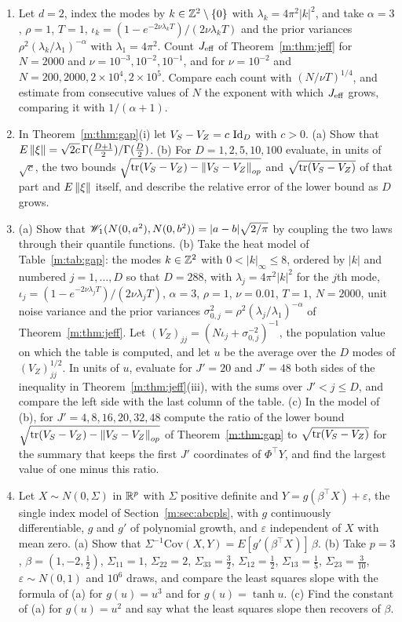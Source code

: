 \begin{enumerate}
\item Let $d=2$, index the modes by $k\in\mathbb{Z}^2\setminus\{0\}$ with $\lambda_k=4\pi^2|k|^2$, and take $\alpha=3$, $\rho=1$, $T=1$, $\iota_k=(1-e^{-2\nu\lambda_kT})/(2\nu\lambda_kT)$ and the prior variances $\rho^2(\lambda_k/\lambda_1)^{-\alpha}$ with $\lambda_1=4\pi^2$. Count $J_{\rm eff}$ of Theorem~\ref{m:thm:jeff} for $N=2000$ and $\nu=10^{-3},10^{-2},10^{-1}$, and for $\nu=10^{-2}$ and $N=200,2000,2\times10^4,2\times10^5$. Compare each count with $(N/\nu T)^{1/4}$, and estimate from consecutive values of $N$ the exponent with which $J_{\rm eff}$ grows, comparing it with $1/(\alpha+1)$.
\item In Theorem~\ref{m:thm:gap}(i) let $V_S-V_Z=c\,\operatorname{Id}_D$ with $c>0$. (a) Show that $E\left\|\xi\right\|=\sqrt{2c}\,\Gamma(\tfrac{D+1}2)/\Gamma(\tfrac D2)$. (b) For $D=1,2,5,10,100$ evaluate, in units of $\sqrt c$, the two bounds $\sqrt{\mathrm{tr}(V_S-V_Z)-\left\|V_S-V_Z\right\|_{op}}$ and $\sqrt{\mathrm{tr}(V_S-V_Z)}$ of that part and $E\left\|\xi\right\|$ itself, and describe the relative error of the lower bound as $D$ grows.
\item (a) Show that $\mathscr{W}_1(N(0,a^2),N(0,b^2))=|a-b|\sqrt{2/\pi}$ by coupling the two laws through their quantile functions. (b) Take the heat model of Table~\ref{m:tab:gap}: the modes $k\in\mathbb{Z}^2$ with $0<|k|_\infty\le8$, ordered by $|k|$ and numbered $j=1,\dots,D$ so that $D=288$, with $\lambda_j=4\pi^2|k|^2$ for the $j$th mode, $\iota_j=(1-e^{-2\nu\lambda_jT})/(2\nu\lambda_jT)$, $\alpha=3$, $\rho=1$, $\nu=0.01$, $T=1$, $N=2000$, unit noise variance and the prior variances $\sigma^2_{0,j}=\rho^2(\lambda_j/\lambda_1)^{-\alpha}$ of Theorem~\ref{m:thm:jeff}. Let $(V_Z)_{jj}=(N\iota_j+\sigma_{0,j}^{-2})^{-1}$, the population value on which the table is computed, and let $u$ be the average over the $D$ modes of $(V_Z)_{jj}^{1/2}$. In units of $u$, evaluate for $J'=20$ and $J'=48$ both sides of the inequality in Theorem~\ref{m:thm:jeff}(iii), with the sums over $J'<j\le D$, and compare the left side with the last column of the table. (c) In the model of (b), for $J'=4,8,16,20,32,48$ compute the ratio of the lower bound $\sqrt{\mathrm{tr}(V_S-V_Z)-\left\|V_S-V_Z\right\|_{op}}$ of Theorem~\ref{m:thm:gap} to $\sqrt{\mathrm{tr}(V_S-V_Z)}$ for the summary that keeps the first $J'$ coordinates of $\Phi^\top Y$, and find the largest value of one minus this ratio.
\item Let $X\sim N(0,\Sigma)$ in $\mathbb{R}^p$ with $\Sigma$ positive definite and $Y=g(\beta^\top X)+\varepsilon$, the single index model of Section~\ref{m:sec:abcpls}, with $g$ continuously differentiable, $g$ and $g'$ of polynomial growth, and $\varepsilon$ independent of $X$ with mean zero. (a) Show that $\Sigma^{-1}\mathrm{Cov}(X,Y)=E[g'(\beta^\top X)]\,\beta$. (b) Take $p=3$, $\beta=(1,-2,\tfrac12)$, $\Sigma_{11}=1$, $\Sigma_{22}=2$, $\Sigma_{33}=\tfrac32$, $\Sigma_{12}=\tfrac12$, $\Sigma_{13}=\tfrac15$, $\Sigma_{23}=\tfrac3{10}$, $\varepsilon\sim N(0,1)$ and $10^6$ draws, and compare the least squares slope with the formula of (a) for $g(u)=u^3$ and for $g(u)=\tanh u$. (c) Find the constant of (a) for $g(u)=u^2$ and say what the least squares slope then recovers of $\beta$.
\end{enumerate}

